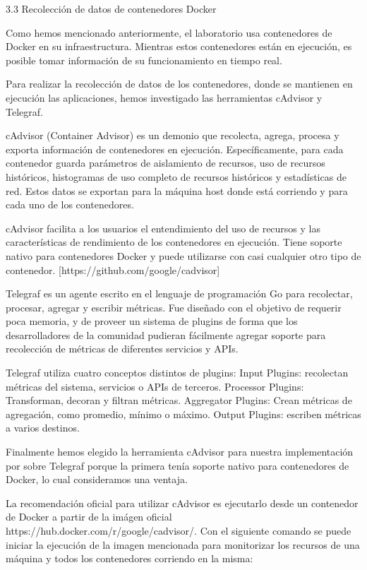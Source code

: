 3.3 Recolección de datos de contenedores Docker
 
Como hemos mencionado anteriormente, el laboratorio usa contenedores de Docker en su infraestructura. Mientras estos contenedores están en ejecución, es posible tomar información de su funcionamiento en tiempo real.

Para realizar la recolección de datos de los contenedores, donde se mantienen en ejecución las aplicaciones, hemos investigado las herramientas cAdvisor y Telegraf. 

cAdvisor (Container Advisor) es un demonio que recolecta, agrega, procesa y exporta información de contenedores en ejecución. Específicamente, para cada contenedor guarda parámetros de aislamiento de recursos, uso de recursos históricos, histogramas de uso completo de recursos históricos y estadísticas de red. Estos datos se exportan para la máquina host donde está corriendo y para cada uno de los contenedores.

cAdvisor facilita a los usuarios el entendimiento del uso de recursos y las características de rendimiento de los contenedores en ejecución. Tiene soporte nativo para contenedores Docker y puede utilizarse con casi cualquier otro tipo de contenedor. [https://github.com/google/cadvisor]

Telegraf es un agente escrito en el lenguaje de programación Go para recolectar, procesar, agregar y escribir métricas. Fue diseñado con el objetivo de requerir poca memoria, y de proveer un sistema de plugins de forma que los desarrolladores de la comunidad pudieran fácilmente agregar soporte para recolección de métricas de diferentes servicios y APIs.

Telegraf utiliza cuatro conceptos distintos de plugins:
Input Plugins: recolectan métricas del sistema, servicios o APIs de terceros.
Processor Plugins: Transforman, decoran y filtran métricas.
Aggregator Plugins: Crean métricas de agregación, como promedio, mínimo o máximo.
Output Plugins: escriben métricas a varios destinos.

Finalmente hemos elegido la herramienta cAdvisor para nuestra implementación por sobre Telegraf porque la primera tenía soporte nativo para contenedores de Docker, lo cual consideramos una ventaja.

La recomendación oficial para utilizar cAdvisor es ejecutarlo desde un contenedor de Docker a partir de la imágen oficial  https://hub.docker.com/r/google/cadvisor/. Con el siguiente comando se puede iniciar la ejecución de la imagen mencionada para monitorizar los recursos de una máquina y todos los contenedores corriendo en la misma:

